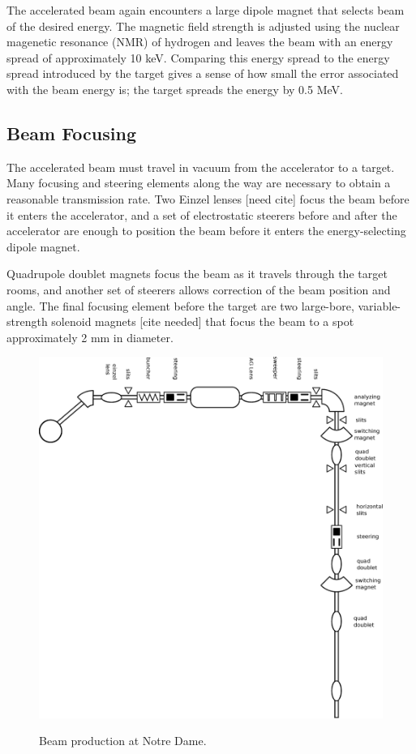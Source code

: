 The accelerated beam again encounters a large dipole magnet that selects beam of the desired energy.  The magnetic field strength is adjusted using the nuclear magenetic resonance (NMR) of hydrogen and leaves the beam with an energy spread of approximately 10 keV.  Comparing this energy spread to the energy spread introduced by the target gives a sense of how small the error associated with the beam energy is; the target spreads the energy by 0.5 MeV.

\subsection{Beam Focusing}

The accelerated beam must travel in vacuum from the accelerator to a target.  Many focusing and steering elements along the way are necessary to obtain a reasonable transmission rate.  Two Einzel lenses [need cite] focus the beam before it enters the accelerator, and a set of electrostatic steerers before and after the accelerator are enough to position the beam before it enters the energy-selecting dipole magnet.

Quadrupole doublet magnets focus the beam as it travels through the target rooms, and another set of steerers allows correction of the beam position and angle.  The final focusing element before the target are two large-bore, variable-strength solenoid magnets [cite needed] that focus the beam to a spot approximately 2 mm in diameter.

\begin{figure}[htp]
\centering
\includegraphics[width=1.0\textwidth]{figures/NSL_beamline.eps}
\label{fig:beamline}
\caption{Beam production at Notre Dame.}
\end{figure}

